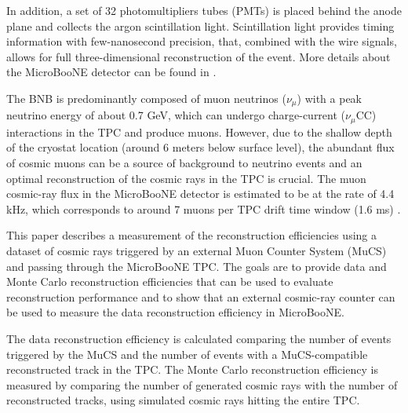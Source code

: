 \documentclass[a4paper,11pt]{article}
\begin{document}
In addition, a set of 32 photomultipliers tubes (PMTs) is placed behind the anode plane and collects the argon scintillation light. Scintillation light provides timing information with few-nanosecond precision, that, combined with the wire signals, allows for full three-dimensional reconstruction of the event. More details about the MicroBooNE detector can be found in \cite{detector}.

The BNB is predominantly composed of muon neutrinos ($\nu_{\mu}$) with a peak neutrino energy of about 0.7 GeV, which can undergo charge-current ($\nu_{\mu}$CC) interactions in the TPC and produce muons. However, due to the shallow depth of the cryostat location (around 6 meters below surface level), the abundant flux of cosmic muons can be a source of background to neutrino events and an optimal reconstruction of the cosmic rays in the TPC is crucial. The muon cosmic-ray flux in the MicroBooNE detector is estimated to be at the rate of 4.4 kHz, which corresponds to around 7 muons per TPC drift time window (1.6 ms) \cite{cosmic}.

This paper describes a measurement of the reconstruction efficiencies using a dataset of cosmic rays triggered by an external Muon Counter System (MuCS) and passing through the MicroBooNE TPC. The goals are to provide data and Monte Carlo reconstruction efficiencies that can be used to evaluate reconstruction performance and to show that an external cosmic-ray counter can be used to measure the data reconstruction efficiency in MicroBooNE.

The data reconstruction efficiency is calculated comparing the number of events triggered by the MuCS and the number of events with a MuCS-compatible reconstructed track in the TPC.
The Monte Carlo reconstruction efficiency is measured by comparing the number of generated cosmic rays with the number of reconstructed tracks, using simulated cosmic rays hitting the entire TPC.


\end{document}
